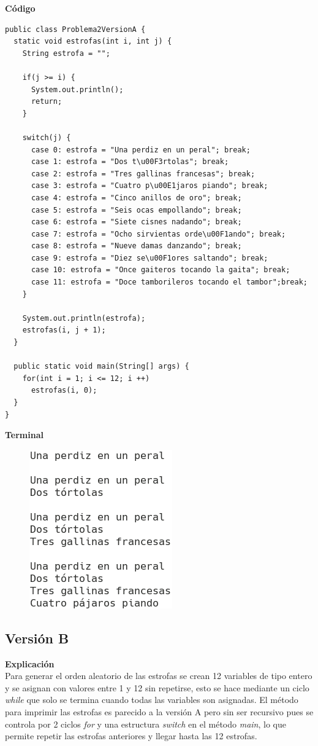 \documentclass[11pt, twocolumn]{article}
\begin{document}
  \textbf{Código}
  \begin{lstlisting}
public class Problema2VersionA {
  static void estrofas(int i, int j) {
    String estrofa = "";
    
    if(j >= i) {
      System.out.println();
      return;
    }

    switch(j) {
      case 0: estrofa = "Una perdiz en un peral"; break;
      case 1: estrofa = "Dos t\u00F3rtolas"; break;
      case 2: estrofa = "Tres gallinas francesas"; break;
      case 3: estrofa = "Cuatro p\u00E1jaros piando"; break;
      case 4: estrofa = "Cinco anillos de oro"; break;
      case 5: estrofa = "Seis ocas empollando"; break;
      case 6: estrofa = "Siete cisnes nadando"; break;
      case 7: estrofa = "Ocho sirvientas orde\u00F1ando"; break;
      case 8: estrofa = "Nueve damas danzando"; break;
      case 9: estrofa = "Diez se\u00F1ores saltando"; break;
      case 10: estrofa = "Once gaiteros tocando la gaita"; break;
      case 11: estrofa = "Doce tamborileros tocando el tambor";break;
    }
  
    System.out.println(estrofa);
    estrofas(i, j + 1);    
  }

  public static void main(String[] args) {
    for(int i = 1; i <= 12; i ++)
      estrofas(i, 0);
  }
}  
  \end{lstlisting}
  
  \textbf{Terminal}
  \begin{figure}[ht]
    \includegraphics[width=0.38\columnwidth, center]{P2A.png}
  \end{figure}

  \subsection*{Versión B} 
  
  \textbf{Explicación} \\
  Para generar el orden aleatorio de las estrofas se crean 12 variables de tipo entero y se asignan con valores entre 1 y 12 sin repetirse, esto se hace mediante un ciclo \textit{while} que solo se termina cuando todas las variables son asignadas. El método para imprimir las estrofas es parecido a la versión A pero sin ser recursivo pues se controla por 2 ciclos \textit{for} y una estructura \textit{switch} en el método \textit{main}, lo que permite repetir las estrofas anteriores y llegar hasta las 12 estrofas.
  
\end{document}
